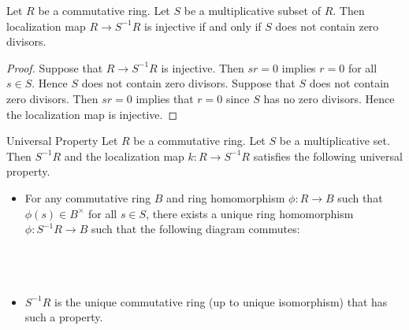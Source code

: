 \documentclass[a4paper]{article}
\begin{document}
\begin{lmm}{}{} Let $R$ be a commutative ring. Let $S$ be a multiplicative subset of $R$. Then localization map $R\to S^{-1}R$ is injective if and only if $S$ does not contain zero divisors. \tcbline
\begin{proof}
Suppose that $R\to S^{-1}R$ is injective. Then $sr=0$ implies $r=0$ for all $s\in S$. Hence $S$ does not contain zero divisors. Suppose that $S$ does not contain zero divisors. Then $sr=0$ implies that $r=0$ since $S$ has no zero divisors. Hence the localization map is injective. 
\end{proof}
\end{lmm}

\begin{prp}{Universal Property}{} Let $R$ be a commutative ring. Let $S$ be a multiplicative set. Then $S^{-1}R$ and the localization map $k:R\to S^{-1}R$ satisfies the following universal property. 
\begin{itemize}
\item For any commutative ring $B$ and ring homomorphism $\phi:R\to B$ such that $\phi(s)\in B^\times$ for all $s\in S$, there exists a unique ring homomorphism $\phi:S^{-1}R\to B$ such that the following diagram commutes: \\~\\
 \\~\\
\item $S^{-1}R$ is the unique commutative ring (up to unique isomorphism) that has such a property. 
\end{itemize}
\end{prp}
\end{document}

